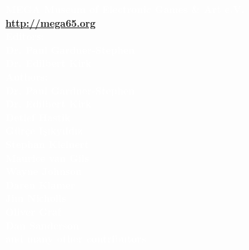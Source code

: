 
\begin{center}

\textbf{\large\textcolor{white}{MEGA Museum of Electronic Games \& Art e.V. \\
\vspace{3mm}
\url{http://mega65.org}}}\\
\vspace{6mm}
\textbf{\large\textcolor{white}{
Editors:\\
\vspace{2mm}
Dr. Paul Gardner-Stephen\\
Dr. Edilbert Kirk\\
\vspace{6mm}
Authors: \\
\vspace{2mm}
Dr. Paul Gardner-Stephen\\
Dr. Edilbert Kirk\\
Detlef Hastik\\
Gürçe Işıkyıldız\\
Stephan Kleinert\\
Maurice van Gils\\
Wayne Johnson\\
Daren Klamer\\
Jim Nicholls\\
Oliver Graf\\
Dan Sanderson\\
\vspace{6mm}
and many other contributors\\
}}
\vspace{4.1cm}
\colorbox{white}{\EANisbn[ISBN=978-0-6452968-1-5,SC4]}
\end{center}



